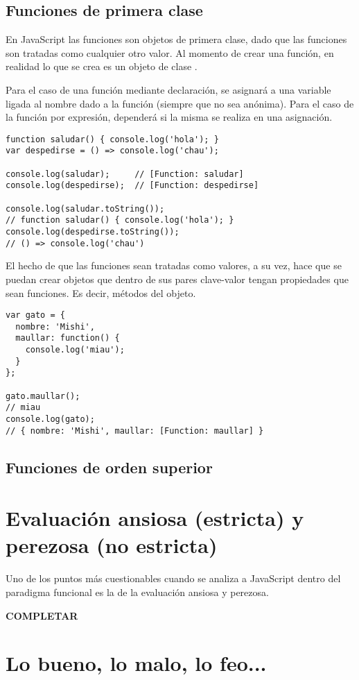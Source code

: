 \subsection{Funciones de primera clase}

En JavaScript las funciones son objetos de primera clase, dado que las funciones son tratadas como cualquier otro valor. Al momento de crear una función, en realidad lo que se crea es un objeto de clase .

Para el caso de una función mediante declaración, se asignará a una variable ligada al nombre dado a la función (siempre que no sea anónima). Para el caso de la función por expresión, dependerá si la misma se realiza en una asignación.

\begin{lstlisting}[title={Analizando el valor de una función}]
function saludar() { console.log('hola'); }
var despedirse = () => console.log('chau');

console.log(saludar);     // [Function: saludar]
console.log(despedirse);  // [Function: despedirse]

console.log(saludar.toString());  
// function saludar() { console.log('hola'); }
console.log(despedirse.toString()); 
// () => console.log('chau')
\end{lstlisting}

El hecho de que las funciones sean tratadas como valores, a su vez, hace que se puedan crear objetos que dentro de sus pares clave-valor tengan propiedades que sean funciones. Es decir, métodos del objeto.

\begin{lstlisting}[title={Asignando una función como valor de una propiedad a un objeto}]
var gato = {
  nombre: 'Mishi',
  maullar: function() {
    console.log('miau');
  }
};

gato.maullar();   
// miau
console.log(gato);  
// { nombre: 'Mishi', maullar: [Function: maullar] }
\end{lstlisting}

\subsection{Funciones de orden superior}

\section{Evaluación ansiosa (estricta) y perezosa (no estricta)}

Uno de los puntos más cuestionables cuando se analiza a JavaScript dentro del paradigma funcional es la de la evaluación ansiosa y perezosa.

\textbf{COMPLETAR}

\section{Lo bueno, lo malo, lo feo...}
